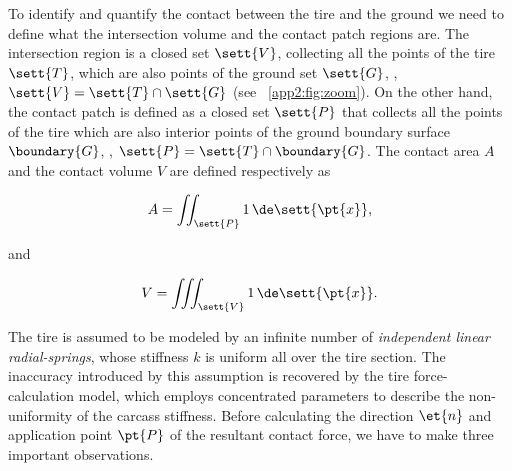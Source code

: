 To identify and quantify the contact between the tire and the ground we need to define what the intersection volume and the contact patch regions are. The intersection region is a closed set $\sett{V}$, collecting all the points of the tire $\sett{T}$, which are also points of the ground set $\sett{G}$, \ie{}, $\sett{V} = \sett{T} \cap \sett{G}$ (see \figurename{}~\ref{app2:fig:zoom}). On the other hand, the contact patch is defined as a closed set $\sett{P}$ that collects all the points of the tire which are also interior points of the ground boundary surface $\boundary{G}$, \ie{}, $\sett{P} = \sett{T} \cap \boundary{G}$. The contact area $A$ and the contact volume $V$ are defined respectively as
%
\begin{center}
  \begin{minipage}[b]{0.425\textwidth}
    \vspace{-\baselineskip}
    \begin{equation}
      A = \iint_\sett{P} 1 \, \de\sett{\pt{x}} \text{,}
      \label{app2:eq:int_area}
    \end{equation}
  \end{minipage}%
  \hfill\hfill and \hfill
  \begin{minipage}[b]{0.425\textwidth}
    \vspace{-\baselineskip}
    \begin{equation}
      V = \iiint_\sett{V} 1 \, \de\sett{\pt{x}} \text{.}
      \label{app2:eq:int_volume}
    \end{equation}
  \end{minipage}
\end{center}

The tire is assumed to be modeled by an infinite number of \emph{independent linear radial-springs}, whose stiffness $k$ is uniform all over the tire section. The inaccuracy introduced by this assumption is recovered by the tire force-calculation model, which employs concentrated parameters to describe the non-uniformity of the carcass stiffness. Before calculating the direction $\et{n}$ and application point $\pt{P}$ of the resultant contact force, we have to make three important observations.

